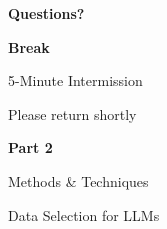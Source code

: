 \documentclass[aspectratio=169]{beamer}
\begin{document}
\begin{frame}

\begin{center}

\vspace{2.5cm}

{\color{ucrblue}\Huge\textbf{Questions?}}

\end{center}

\end{frame}

\begin{frame}

\begin{center}

\vspace{2cm}

{\color{ucrblue}\Huge\textbf{Break}}

\vspace{0.8cm}

{\LARGE 5-Minute Intermission}

\vspace{1cm}

{\large Please return shortly}

\end{center}

\end{frame}

\begin{frame}

\begin{center}

\vspace{2cm}

{\color{ucrblue}\Huge\textbf{Part 2}}

\vspace{0.8cm}

{\LARGE Methods \& Techniques}

\vspace{1cm}

{\large Data Selection for LLMs}

\end{center}

\end{frame}
\end{document}
